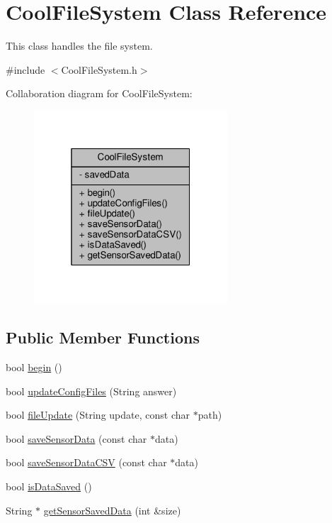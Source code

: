\hypertarget{class_cool_file_system}{}\section{Cool\+File\+System Class Reference}
\label{class_cool_file_system}


This class handles the file system.  




{\ttfamily \#include $<$Cool\+File\+System.\+h$>$}



Collaboration diagram for Cool\+File\+System\+:\nopagebreak
\begin{figure}[H]
\begin{center}
\leavevmode
\includegraphics[width=205pt]{d0/d8f/class_cool_file_system__coll__graph}
\end{center}
\end{figure}
\subsection*{Public Member Functions}
\begin{DoxyCompactItemize}
\item 
bool \hyperlink{class_cool_file_system_a6ba6f666ed4c530174f8569d2c636748}{begin} ()
\item 
bool \hyperlink{class_cool_file_system_adfa8e2e80641ae6f0cceabd348a9b841}{update\+Config\+Files} (String answer)
\item 
bool \hyperlink{class_cool_file_system_a13f2958f5b87757c31fc53797a30d23a}{file\+Update} (String update, const char $\ast$path)
\item 
bool \hyperlink{class_cool_file_system_afa3a4feae94871d4d3b6bebb701c2e67}{save\+Sensor\+Data} (const char $\ast$data)
\item 
bool \hyperlink{class_cool_file_system_ab78704d5d21ce10fc6f1138ab5ab46c8}{save\+Sensor\+Data\+C\+SV} (const char $\ast$data)
\item 
bool \hyperlink{class_cool_file_system_a5a7eaeea7a9fbf8aaef651d862fa3b5b}{is\+Data\+Saved} ()
\item 
String $\ast$ \hyperlink{class_cool_file_system_a3223ffff4266a6300988fab956d6b4b2}{get\+Sensor\+Saved\+Data} (int \&size)
\end{DoxyCompactItemize}
